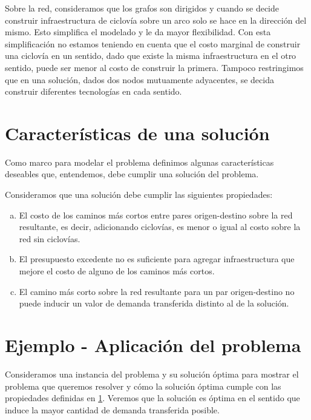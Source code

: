 Sobre la red, consideramos que los grafos son dirigidos y cuando se decide construir infraestructura de ciclovía sobre un arco solo se hace en la dirección del mismo. Esto simplifica el modelado y le da mayor flexibilidad. Con esta simplificación no estamos teniendo en cuenta que el costo marginal de construir una ciclovía en un sentido, dado que existe la misma infraestructura en el otro sentido, puede ser menor al costo de construir la primera. Tampoco restringimos que en una solución, dados dos nodos mutuamente adyacentes, se decida construir diferentes tecnologías en cada sentido.

\section{Características de una solución}
\label{sect:solutioncharacteristics}

Como marco para modelar el problema definimos algunas características deseables que, entendemos, debe cumplir una solución del problema.

Consideramos que una solución debe cumplir las siguientes propiedades:

\begin{enumerate}[(a)]
    \item{El costo de los caminos más cortos entre pares origen-destino sobre la red resultante, es decir, adicionando ciclovías, es menor o igual al costo sobre la red sin ciclovías.}
  \item{\label{budgetexcess} El presupuesto excedente no es suficiente para agregar infraestructura que mejore el costo de alguno de los caminos más cortos.}
  \item{El camino más corto sobre la red resultante para un par origen-destino no puede inducir un valor de demanda transferida distinto al de la solución.}
\end{enumerate}

\section{Ejemplo - Aplicación del problema}
\label{sect:example1}

Consideramos una instancia del problema y su solución óptima para mostrar el problema que queremos resolver y cómo la solución óptima cumple con las propiedades definidas en \ref{sect:solutioncharacteristics}. Veremos que la solución es óptima en el sentido que induce la mayor cantidad de demanda transferida posible.

